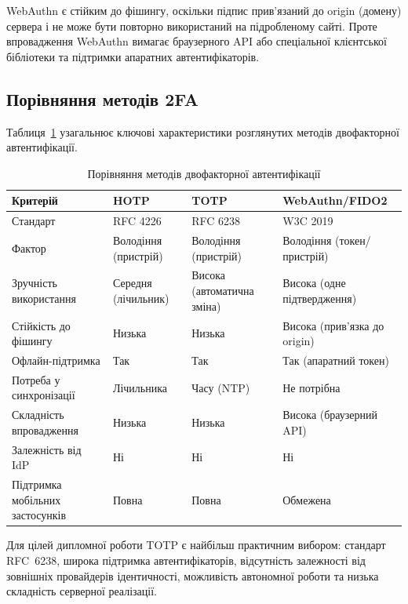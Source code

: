 WebAuthn є стійким до фішингу, оскільки підпис прив'язаний до origin (домену)
сервера і не може бути повторно використаний на підробленому сайті. Проте
впровадження WebAuthn вимагає браузерного API або спеціальної клієнтської
бібліотеки та підтримки апаратних автентифікаторів.

\subsection{Порівняння методів 2FA}

Таблиця~\ref{tab:2fa_comparison} узагальнює ключові характеристики розглянутих
методів двофакторної автентифікації.

\begin{table}[htbp]
\caption{Порівняння методів двофакторної автентифікації}
\label{tab:2fa_comparison}
\small
\begin{tabularx}{\textwidth}{|p{3.8cm}|X|X|X|}
\hline
\textbf{Критерій} & \textbf{HOTP} & \textbf{TOTP} & \textbf{WebAuthn/FIDO2} \\
\hline
Стандарт & RFC 4226 & RFC 6238 & W3C 2019 \\
\hline
Фактор & Володіння (пристрій) & Володіння (пристрій) & Володіння (токен/пристрій) \\
\hline
Зручність використання & Середня (лічильник) & Висока (автоматична зміна) & Висока (одне підтвердження) \\
\hline
Стійкість до фішингу & Низька & Низька & Висока (прив'язка до origin) \\
\hline
Офлайн-підтримка & Так & Так & Так (апаратний токен) \\
\hline
Потреба у синхронізації & Лічильника & Часу (NTP) & Не потрібна \\
\hline
Складність впровадження & Низька & Низька & Висока (браузерний API) \\
\hline
Залежність від IdP & Ні & Ні & Ні \\
\hline
Підтримка мобільних застосунків & Повна & Повна & Обмежена \\
\hline
\end{tabularx}
\end{table}

Для цілей дипломної роботи TOTP є найбільш практичним вибором: стандарт RFC~6238,
широка підтримка автентифікаторів, відсутність залежності від зовнішніх
провайдерів ідентичності, можливість автономної роботи та низька складність
серверної реалізації.

